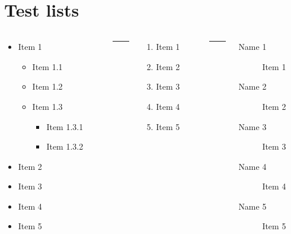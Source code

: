 \documentclass[%
    listings={
        Lean=listings-lean,
        Go
    }
]{custom}
\begin{document}
\section{Test lists}
\begin{sframe}
	\begin{columns}
		\begin{column}{.32\linewidth}
			\begin{itemize}
				\item Item 1
				      \begin{itemize}
					      \item Item 1.1
					      \item Item 1.2
					      \item Item 1.3
					            \begin{itemize}
						            \item Item 1.3.1
						            \item Item 1.3.2
					            \end{itemize}
				      \end{itemize}
				\item Item 2
				\item Item 3
				\item Item 4
				\item Item 5
			\end{itemize}
		\end{column}
		\begin{column}{.05\linewidth}
			\centering
			\rule{.1mm}{.7\textheight}
		\end{column}
		\begin{column}{.24\linewidth}
			\begin{enumerate}
				\item Item 1
				\item Item 2
				\item Item 3
				\item Item 4
				\item Item 5
			\end{enumerate}
		\end{column}
		\begin{column}{.05\linewidth}
			\centering
			\rule{.1mm}{.7\textheight}
		\end{column}
		\begin{column}{.3\linewidth}
			\begin{description}
				\item[Name 1] Item 1
				\item[Name 2] Item 2
				\item[Name 3] Item 3
				\item[Name 4] Item 4
				\item[Name 5] Item 5
			\end{description}
		\end{column}
	\end{columns}
\end{sframe}
\end{document}
